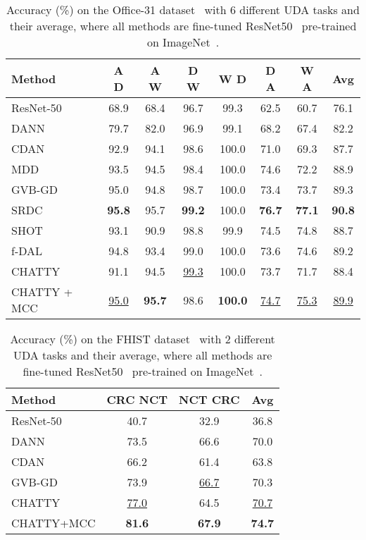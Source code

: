\documentclass[10pt,twocolumn,letterpaper]{article}
\begin{document}
\begin{table*}
\begin{center}
\begin{tabular}{|l|c|c|c|c|c|c|c|}
\hline
Method	&	A  D 	&	A  W	&	D  W	&	W  D	&	D  A	&	W  A	&	Avg \\
\hline
ResNet-50~\cite{resnet}	&	68.9	&	68.4	&	96.7	&	99.3	&	62.5	&	60.7	&	76.1 \\
DANN~\cite{dann}	&	79.7	&	82.0	&	96.9	&	99.1	&	68.2	&	67.4	&	82.2 \\
CDAN~\cite{cdan}	&	92.9	&	94.1	&	98.6	&	100.0	&	71.0	&	69.3	&	87.7 \\
MDD~\cite{mdd}	&	93.5	&	94.5	&	98.4	&	100.0	&	74.6	&	72.2	&	88.9 \\
GVB-GD~\cite{gvb}	&	95.0	&	94.8	&	98.7	&	100.0	&	73.4	&	73.7	&	89.3 \\
SRDC~\cite{srdc}	&	\textbf{95.8}	&	95.7	&	\textbf{99.2}	&	100.0	&	\textbf{76.7}	&	\textbf{77.1}	&	\textbf{90.8} \\
SHOT~\cite{shot}	&	93.1	&	90.9	&	98.8 &	99.9	&	74.5	&	74.8	&	88.7 \\
f-DAL~\cite{fdal}	&	94.8	&	93.4	&	99.0 &	100.0	&	73.6	&	74.6	&	89.2 \\
\hline
CHATTY	&	91.1	&	94.5	&	\underline{99.3} &	100.0	&	73.7	&	71.7	&	88.4 \\
CHATTY + MCC	&	\underline{95.0}	&	\textbf{95.7}	&	98.6	&	\textbf{100.0} &	\underline{74.7} &	\underline{75.3}&	\underline{89.9} \\
\hline
\end{tabular}
\end{center}
\caption{Accuracy (\%) on the Office-31 dataset~\cite{office31} with 6 different UDA tasks and their average, where all methods are fine-tuned ResNet50~\cite{resnet} pre-trained on ImageNet~\cite{imagenet}.}
\label{table:office-31}
\end{table*}


\begin{table}
\begin{center}
\begin{tabular}{|l|c|c|c|}
\hline
Method	&	CRC  NCT	&	NCT  CRC	&	Avg	\\
\hline
ResNet-50~\cite{resnet}	&	40.7	&	32.9	&	36.8	\\
DANN~\cite{dann}	&	73.5	&	66.6	&	70.0	\\
CDAN~\cite{cdan}	&	66.2	&	61.4	&	63.8	\\
GVB-GD~\cite{gvb}	&	73.9	&	 \underline{66.7} &	70.3	\\
\hline
CHATTY	&	\underline{77.0} & 64.5	&	\underline{70.7} \\
CHATTY+MCC	&	\textbf{81.6}	&	\textbf{67.9}	&	\textbf{74.7}	\\
\hline
\end{tabular}
\end{center}
\caption{Accuracy (\%) on the FHIST dataset~\cite{fhist} with 2 different UDA tasks and their average, where all methods are fine-tuned ResNet50~\cite{resnet} pre-trained on ImageNet~\cite{imagenet}.}
\label{table:fhist}
\end{table}
\end{document}
